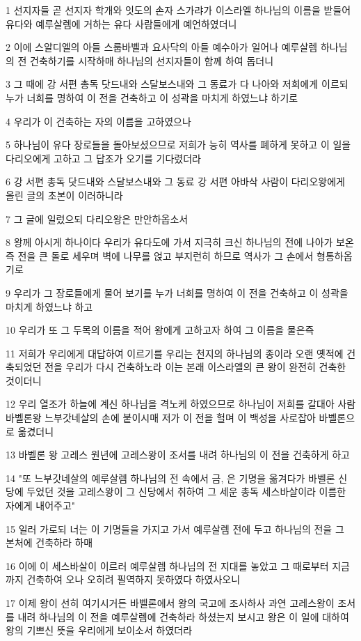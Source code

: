 \par 1 선지자들 곧 선지자 학개와 잇도의 손자 스가랴가 이스라엘 하나님의 이름을 받들어 유다와 예루살렘에 거하는 유다 사람들에게 예언하였더니
\par 2 이에 스알디엘의 아들 스룹바벨과 요사닥의 아들 예수아가 일어나 예루살렘 하나님의 전 건축하기를 시작하매 하나님의 선지자들이 함께 하여 돕더니
\par 3 그 때에 강 서편 총독 닷드내와 스달보스내와 그 동료가 다 나아와 저희에게 이르되 누가 너희를 명하여 이 전을 건축하고 이 성곽을 마치게 하였느냐 하기로
\par 4 우리가 이 건축하는 자의 이름을 고하였으나
\par 5 하나님이 유다 장로들을 돌아보셨으므로 저희가 능히 역사를 폐하게 못하고 이 일을 다리오에게 고하고 그 답조가 오기를 기다렸더라
\par 6 강 서편 총독 닷드내와 스달보스내와 그 동료 강 서편 아바삭 사람이 다리오왕에게 올린 글의 초본이 이러하니라
\par 7 그 글에 일렀으되 다리오왕은 만안하옵소서
\par 8 왕께 아시게 하나이다 우리가 유다도에 가서 지극히 크신 하나님의 전에 나아가 보온즉 전을 큰 돌로 세우며 벽에 나무를 얹고 부지런히 하므로 역사가 그 손에서 형통하옵기로
\par 9 우리가 그 장로들에게 물어 보기를 누가 너희를 명하여 이 전을 건축하고 이 성곽을 마치게 하였느냐 하고
\par 10 우리가 또 그 두목의 이름을 적어 왕에게 고하고자 하여 그 이름을 물은즉
\par 11 저희가 우리에게 대답하여 이르기를 우리는 천지의 하나님의 종이라 오랜 옛적에 건축되었던 전을 우리가 다시 건축하노라 이는 본래 이스라엘의 큰 왕이 완전히 건축한 것이더니
\par 12 우리 열조가 하늘에 계신 하나님을 격노케 하였으므로 하나님이 저희를 갈대아 사람 바벨론왕 느부갓네살의 손에 붙이시매 저가 이 전을 헐며 이 백성을 사로잡아 바벨론으로 옮겼더니
\par 13 바벨론 왕 고레스 원년에 고레스왕이 조서를 내려 하나님의 이 전을 건축하게 하고
\par 14 "또 느부갓네살의 예루살렘 하나님의 전 속에서 금, 은 기명을 옮겨다가 바벨론 신당에 두었던 것을 고레스왕이 그 신당에서 취하여 그 세운 총독 세스바살이라 이름한 자에게 내어주고"
\par 15 일러 가로되 너는 이 기명들을 가지고 가서 예루살렘 전에 두고 하나님의 전을 그 본처에 건축하라 하매
\par 16 이에 이 세스바살이 이르러 예루살렘 하나님의 전 지대를 놓았고 그 때로부터 지금까지 건축하여 오나 오히려 필역하지 못하였다 하였사오니
\par 17 이제 왕이 선히 여기시거든 바벨론에서 왕의 국고에 조사하사 과연 고레스왕이 조서를 내려 하나님의 이 전을 예루살렘에 건축하라 하셨는지 보시고 왕은 이 일에 대하여 왕의 기쁘신 뜻을 우리에게 보이소서 하였더라


